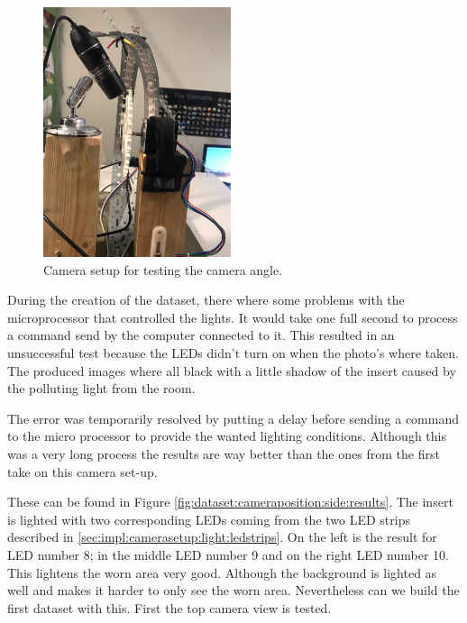 		\begin{figure}[hbtp]
			\centering
			\includegraphics[width=0.49\textwidth, keepaspectratio=true,angle=270]{./fig/Vision/Dataset/automated_datasets/1_check_camera_position/1_camera_position_side/achter2.jpeg}
			\caption{Camera setup for testing the camera angle.}
			\label{fig:dataset:cameraposition:side}
		\end{figure}

		During the creation of the dataset, there where some problems with the microprocessor that controlled the lights. It would take one full second to process a command send by the computer connected to it. This resulted in an unsuccessful test because the LEDs didn't turn on when the photo's where taken. The produced images where all black with a little shadow of the insert caused by the polluting light from the room. 

		The error was temporarily resolved by putting a delay before sending a command to the micro processor to provide the wanted lighting conditions. Although this was a very long process the results are way better than the ones from the first take on this camera set-up. 

		These can be found in Figure \ref{fig:dataset:cameraposition:side:results}. The insert is lighted with two corresponding LEDs coming from the two LED strips described in \ref{sec:impl:camerasetup:light:ledstrips}. On the left is the result for LED number 8; in the middle LED number 9 and on the right LED number 10. This lightens the worn area very good. Although the background is lighted as well and makes it harder to only see the worn area. Nevertheless can we build the first dataset with this. First the top camera view is tested.


